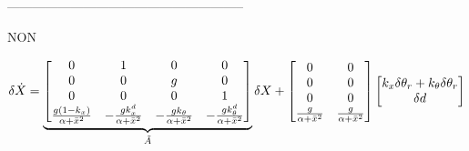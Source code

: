 \documentclass[10pt]{article}
\begin{document}
--------------------------------------------------------

\vspace{10px}



NON

\[
	\delta \dot X = \underbrace{
	\begin{bmatrix}
		0 & 1 & 0 & 0 \\
		0 & 0 & g & 0 \\
		0 & 0 & 0 & 1 \\
		\frac{g (1 - k_x) }{\alpha + \bar x^2} & - \frac{g k^d_x }{\alpha + \bar x^2} & - \frac{g k_{\theta} }{\alpha + \bar x^2} & - \frac{g k^d_{\theta} }{\alpha + \bar x^2}
	\end{bmatrix}
	}_{\tilde A}
	\delta X
	+
	\begin{bmatrix}
		0 & 0 \\
		0 & 0 \\
		0 & 0 \\
		\frac{g  }{\alpha + \bar x^2} & \frac{g  }{\alpha + \bar x^2}
	\end{bmatrix}
	\begin{bmatrix}
		k_x \delta \theta_r + k_{\theta} \delta \theta_r \\ \delta d
	\end{bmatrix}
\]
\end{document}
